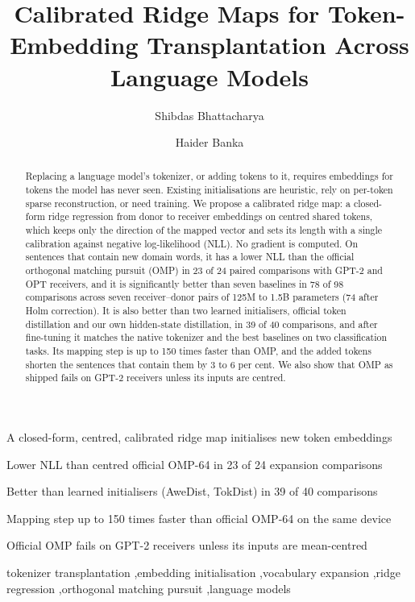 \documentclass[preprint,12pt]{elsarticle}
\begin{document}
\begin{frontmatter}
\title{Calibrated Ridge Maps for Token-Embedding Transplantation Across Language Models}

\author[a]{Shibdas Bhattacharya}
\author[a]{Haider Banka}

\begin{highlights}
\item A closed-form, centred, calibrated ridge map initialises new token embeddings
\item Lower NLL than centred official OMP-64 in 23 of 24 expansion comparisons
\item Better than learned initialisers (AweDist, TokDist) in 39 of 40 comparisons
\item Mapping step up to 150 times faster than official OMP-64 on the same device
\item Official OMP fails on GPT-2 receivers unless its inputs are mean-centred
\end{highlights}

\begin{abstract}
Replacing a language model's tokenizer, or adding tokens to it, requires embeddings for tokens the model has never seen. Existing initialisations are heuristic, rely on per-token sparse reconstruction, or need training. We propose a calibrated ridge map: a closed-form ridge regression from donor to receiver embeddings on centred shared tokens, which keeps only the direction of the mapped vector and sets its length with a single calibration against negative log-likelihood (NLL). No gradient is computed. On sentences that contain new domain words, it has a lower NLL than the official orthogonal matching pursuit (OMP) in 23 of 24 paired comparisons with GPT-2 and OPT receivers, and it is significantly better than seven baselines in 78 of 98 comparisons across seven receiver--donor pairs of 125M to 1.5B parameters (74 after Holm correction). It is also better than two learned initialisers, official token distillation and our own hidden-state distillation, in 39 of 40 comparisons, and after fine-tuning it matches the native tokenizer and the best baselines on two classification tasks. Its mapping step is up to 150 times faster than OMP, and the added tokens shorten the sentences that contain them by 3 to 6 per cent. We also show that OMP as shipped fails on GPT-2 receivers unless its inputs are centred.
\end{abstract}

\begin{keyword}
tokenizer transplantation \sep embedding initialisation \sep vocabulary expansion \sep ridge regression \sep orthogonal matching pursuit \sep language models
\end{keyword}
\end{frontmatter}
\end{document}
